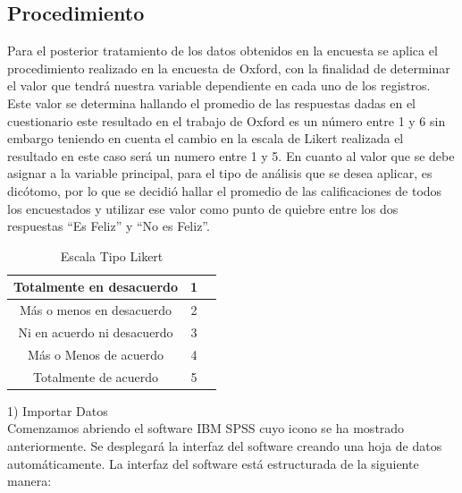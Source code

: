 \documentclass[conference]{IEEEtran}
\begin{document}
\subsection{Procedimiento}
   Para el posterior tratamiento de los datos obtenidos en la encuesta se aplica el procedimiento realizado en la encuesta de Oxford, con la finalidad de determinar el valor que tendrá nuestra variable dependiente en cada uno de los registros. Este valor se determina hallando el promedio de las respuestas dadas en el cuestionario este resultado en el trabajo de Oxford es un número entre 1 y 6 sin embargo teniendo en cuenta el cambio en la escala de Likert realizada el resultado en este caso será un numero entre 1 y 5. En cuanto al valor que se debe asignar a la variable principal, para el tipo de análisis que se desea aplicar, es dicótomo, por lo que se decidió hallar el promedio de las calificaciones de todos los encuestados y utilizar ese valor como punto de quiebre entre los dos respuestas “Es Feliz” y “No es Feliz”.\\
   \begin{table}[h]
\caption{Escala Tipo Likert }
\label{tabla 1}
\begin{center}
\begin{tabular}{|c||c||c|}
\hline
 Totalmente en desacuerdo & 1\\ \hline
 Más o menos en desacuerdo & 2\\ \hline
 Ni en acuerdo ni desacuerdo & 3\\ \hline
 Más o Menos de acuerdo & 4\\ \hline
 Totalmente de acuerdo & 5\\ \hline
\end{tabular}
\end{center}
\end{table}
1)	Importar Datos\\
Comenzamos abriendo el software IBM SPSS cuyo icono
se ha mostrado anteriormente. Se desplegará la interfaz del
software creando una hoja de datos automáticamente. La
interfaz del software está estructurada de la siguiente manera:\\
\end{document}
